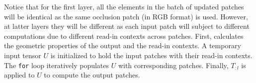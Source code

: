 \begin{algorithm}
\end{algorithm}


Notice that for the first layer, all the elements in the batch of updated patches will be identical as the same occlusion patch (in RGB format) is used.
However, at latter layers they will be different as each input patch will subject to different computations due to different read-in contexts across patches.
First,  calculates the geometric properties of the output and the read-in contexts.
A temporary input tensor $U$ is initialized to hold the input patches with their read-in contexts.
The \texttt{for} loop iteratively populates $U$ with corresponding patches.
Finally, $T_{:l}$ is applied to $U$ to compute the output patches.

